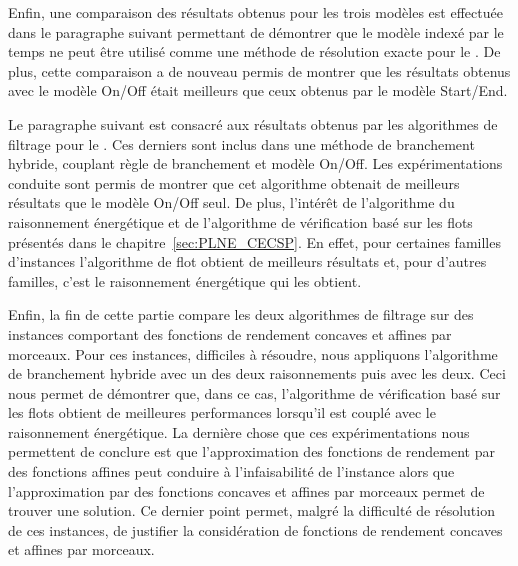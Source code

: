 Enfin, une comparaison des résultats obtenus pour les trois modèles
est effectuée dans le paragraphe suivant permettant de démontrer que
le modèle indexé par le temps ne peut être utilisé comme une méthode
de résolution exacte pour le \CECSP. De plus, cette comparaison a
de nouveau permis de montrer que les résultats obtenus avec le modèle
On/Off était meilleurs que ceux obtenus par le modèle Start/End. 

Le paragraphe suivant est consacré aux résultats obtenus par les
algorithmes de filtrage pour le \CECSP. Ces derniers sont inclus dans
une méthode de branchement hybride, couplant règle de branchement et
modèle On/Off. Les expérimentations conduite sont
permis de montrer que cet algorithme obtenait de meilleurs résultats
que le modèle On/Off seul. De plus, l'intérêt de l'algorithme du
raisonnement énergétique et de l'algorithme de vérification basé sur
les flots présentés dans le chapitre~\ref{sec:PLNE_CECSP}. En effet,
pour certaines familles d'instances l'algorithme de flot obtient de
meilleurs résultats et, pour d'autres familles, c'est le raisonnement
énergétique qui les obtient. 

Enfin, la fin de cette partie compare les deux algorithmes de
filtrage sur des instances comportant des fonctions de rendement
concaves et affines par morceaux. Pour ces instances, difficiles à
résoudre, nous appliquons l'algorithme de branchement hybride avec un
des deux raisonnements puis avec les deux. Ceci nous permet de
démontrer que, dans ce cas, l'algorithme de vérification basé sur les
flots obtient de meilleures performances lorsqu'il est couplé avec le
raisonnement énergétique. La dernière chose que ces expérimentations
nous permettent de conclure est que l'approximation des fonctions de
rendement par des fonctions affines peut conduire à l'infaisabilité de
l'instance alors que l'approximation par des fonctions concaves et
affines par morceaux permet de trouver une solution. Ce dernier point
permet, malgré la difficulté de résolution de ces instances, de
justifier la considération de fonctions de rendement concaves et
affines par morceaux. 